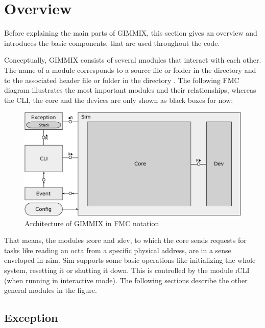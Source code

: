 \section{Overview}

Before explaining the main parts of GIMMIX, this section gives an overview and introduces the basic components, that are used throughout the code.

Conceptually, GIMMIX consists of several \i{modules} that interact with each other. The name of a module corresponds to a source file or folder in the directory  and to the associated header file or folder in the directory . The following \gls{FMC} diagram illustrates the most important modules and their relationships, whereas the CLI, the core and the devices are only shown as black boxes for now:
\begin{figure}[H]
	\centering
	\includegraphics[width=\textwidth]{img/sim-fmc-crop.pdf}
	\caption{Architecture of GIMMIX in \protect\gls{FMC} notation}
	\label{fig:gimmix-arch}
\end{figure}
\noindent That means, the modules \i{core} and \i{dev}, to which the core sends requests for tasks like reading an octa from a specific physical address, are in a sense enveloped in \i{sim}. Sim supports some basic operations like initializing the whole system, resetting it or shutting it down. This is controlled by the module \i{CLI} (when running in interactive mode). The following sections describe the other general modules in the figure.

\subsection{Exception}

